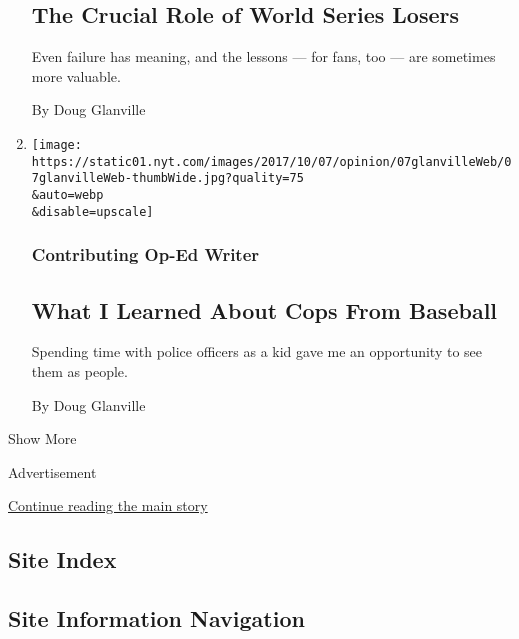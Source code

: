 \begin{enumerate}
  \hypertarget{the-crucial-role-of-world-series-losers}{%
  \subsection{The Crucial Role of World Series
  Losers}\label{the-crucial-role-of-world-series-losers}}

  Even failure has meaning, and the lessons --- for fans, too --- are
  sometimes more valuable.

  By Doug Glanville
\item
  \href{/2017/10/06/opinion/police-baseball.html}{}

  \texttt{[image: https://static01.nyt.com/images/2017/10/07/opinion/07glanvilleWeb/07glanvilleWeb-thumbWide.jpg?quality=75\\\&auto=webp\\\&disable=upscale]}

  \hypertarget{contributing-op-ed-writer-1}{%
  \subsubsection{Contributing Op-Ed
  Writer}\label{contributing-op-ed-writer-1}}

  \hypertarget{what-i-learned-about-cops-from-baseball}{%
  \subsection{What I Learned About Cops From
  Baseball}\label{what-i-learned-about-cops-from-baseball}}

  Spending time with police officers as a kid gave me an opportunity to
  see them as people.

  By Doug Glanville
\end{enumerate}

Show More

Advertisement

\protect\hyperlink{after-mid2}{Continue reading the main story}

\hypertarget{site-index}{%
\subsection{Site Index}\label{site-index}}

\hypertarget{site-information-navigation}{%
\subsection{Site Information
Navigation}\label{site-information-navigation}}

